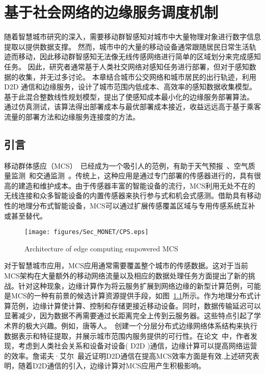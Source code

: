 \chapter{基于社会网络的边缘服务调度机制}

随着智慧城市研究的深入，需要移动群智感知对城市中大量物理对象进行数字信息提取以提供数据支撑。
然而，城市中的大量的移动设备通常跟随居民日常生活轨迹而移动，因此移动群智感知无法像无线传感网络进行简单的区域划分来完成感知任务。
因此，研究者通常基于人类社交网络对感知任务进行部署，但对于感知数据的收集，并无过多讨论。
本章结合城市公交网络和城市居民的出行轨迹，利用 D2D 通信和边缘服务，设计了城市范围内低成本、高效率的感知数据收集模型。
基于此混合整数线性规划模型，提出了使感知成本最小化的边缘服务部署算法。
通过仿真测试，该算法得出部署成本与最优部署成本接近，收益远远高于基于乘客流量的部署方法和边缘服务连接度的方法。

\section{引言}

移动群体感应（MCS）~\cite{ganti2011mobile,DBLP:journals/csur/GuoWYWYHZ15}已经成为一个吸引人的范例，有助于天气预报~\cite{DBLP:conf/icc/YuZZWKL10}、空气质量监测~\cite{DBLP:conf/huc/ZhangXWC14}和交通监测~\cite{DBLP:conf/icdcs/ZhouJL15}。传统上，这种应用是通过专门部署的传感器进行的，具有很高的建造和维护成本。由于传感器丰富的智能设备的流行，MCS利用无处不在的无线连接和众多智能设备的内置传感器来执行参与式和机会式感测。借助具有移动性的地理分布式智能设备，MCS可以通过扩展传感覆盖区域与专用传感系统互补或甚至替代。

\begin{figure}[!h]
\centering
\texttt{[image: figures/Sec\_MONET/CPS.eps]}
\vspace{-0.5em}
\caption{Architecture of edge computing empowered MCS}
\label{Figure_edge}
\end{figure}

对于智慧城市应用，MCS应用通常需要覆盖整个城市的传感数据。这对于当前MCS架构在大量额外的移动网络流量以及相应的数据处理任务方面提出了新的挑战。针对这种现象，边缘计算作为将云服务扩展到网络边缘的新型计算范例，可能是MCS的一种有前景的候选计算资源提供手段，如图~\ref{Figure_edge}所示。作为地理分布式计算范例，边缘计算使计算、控制和存储更接近移动设备。同时，数据传输延迟可以显著减少，因为数据不再需要通过长距离完全上传到云服务器。这些特点引起了学术界的极大兴趣。例如，唐等人。~\cite{DBLP:journals/tii/TangCHPWHY17}创建一个分层分布式边缘网络体系结构来执行数据表示和特征提取，并展示城市范围内服务提供的可行性。在论文~\cite{DBLP:conf/wasa/Yan0WWW17}中，作者发现，考虑到人类社会关系和设备对设备( D2D )通信，边缘计算可以提高网络运营的效率。詹诺夫·艾尔~\cite{DBLP:journals/iotj/ZhanXZW18}最近证明D2D通信在提高MCS效率方面是有效.上述研究表明，随着D2D通信的引入，边缘计算对MCS应用产生积极影响。


